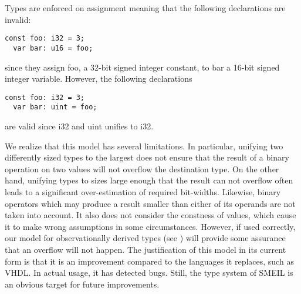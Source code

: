 Types are enforced on assignment meaning that the following declarations are
invalid:
\begin{lstlisting}[language=smeil]
  const foo: i32 = 3;
  var bar: u16 = foo;
\end{lstlisting}
since they assign {\ttfamily foo}, a 32-bit signed integer constant, to {\ttfamily bar} a
16-bit signed integer variable. However, the following declarations
\begin{lstlisting}[language=smeil]
  const foo: i32 = 3;
  var bar: uint = foo;
\end{lstlisting}
are valid since {\ttfamily i32} and {\ttfamily uint} unifies to {\ttfamily i32}.




We realize that this model has several limitations. In particular, unifying two
differently sized types to the largest does not ensure that the result of a
binary operation on two values will not overflow the destination type. On the
other hand, unifying types to sizes large enough that the result can not
overflow often leads to a significant over-estimation of required
bit-widths. Likewise, binary operators which may produce a result smaller than
either of its operands are not taken into account. It also does not consider the
constness of values, which cause it to make wrong assumptions in some
circumstances. However, if used correctly, our model for observationally derived
types (see ) will provide some assurance that an overflow will
not happen. The justification of this model in its current form is that it is an
improvement compared to the languages it replaces, such as VHDL. In actual
usage, it has detected bugs. Still, the type system of SMEIL is an obvious
target for future improvements.

